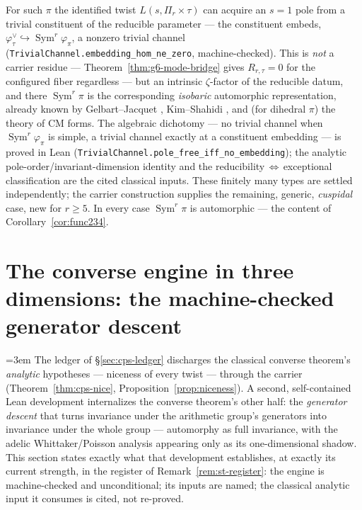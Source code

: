 \documentclass[11pt]{article}
\theoremstyle{definition}
\newcommand{\Sym}{\operatorname{Sym}}
\begin{document}
For such $\pi$ the identified twist $L(s,\Pi_r\times\tau)$ can acquire an $s=1$ pole from a trivial constituent
of the reducible parameter --- the constituent embeds, $\varphi_\tau^\vee\hookrightarrow\Sym^r\varphi_\pi$, a
nonzero trivial channel (\texttt{TrivialChannel.embedding\_hom\_ne\_zero}, machine-checked). This is \emph{not}
a carrier residue --- Theorem~\ref{thm:g6-mode-bridge} gives $R_{r,\tau}=0$ for the configured fiber regardless
--- but an intrinsic $\zeta$-factor of the reducible datum, and there $\Sym^r\pi$ is the corresponding
\emph{isobaric} automorphic representation, already known by Gelbart--Jacquet \cite{GJ}, Kim--Shahidi
\cite{KimShahidi}, and (for dihedral $\pi$) the theory of CM forms. The algebraic dichotomy --- no trivial
channel when $\Sym^r\varphi_\pi$ is simple, a trivial channel exactly at a constituent embedding --- is proved
in Lean (\texttt{TrivialChannel.pole\_free\_iff\_no\_embedding}); the analytic pole-order/invariant-dimension
identity and the reducibility$\,\Leftrightarrow\,$exceptional classification are the cited classical inputs.
These finitely many types are settled independently; the carrier construction supplies the remaining, generic,
\emph{cuspidal} case, new for $r\ge5$. In every case $\Sym^r\pi$ is automorphic --- the content of
Corollary~\ref{cor:func234}.

\section{The converse engine in three dimensions: the machine-checked generator descent}\label{sec:cps-3d-engine}
\begingroup
\emergencystretch=3em
\let\cpsoldunderscore\_
\renewcommand{\_}{\cpsoldunderscore\allowbreak}%
The ledger of \S\ref{sec:cps-ledger} discharges the classical converse theorem's \emph{analytic}
hypotheses --- niceness of every twist --- through the carrier (Theorem~\ref{thm:cps-nice},
Proposition~\ref{prop:niceness}). A second, self-contained Lean development internalizes the converse
theorem's other half: the \emph{generator descent} that turns invariance under the arithmetic group's
generators into invariance under the whole group --- automorphy as full invariance, with the adelic
Whittaker/Poisson analysis appearing only as its one-dimensional shadow. This section states exactly what
that development establishes, at exactly its current strength, in the register of
Remark~\ref{rem:st-register}: the engine is machine-checked and unconditional; its inputs are named; the
classical analytic input it consumes is cited, not re-proved.
\end{document}
